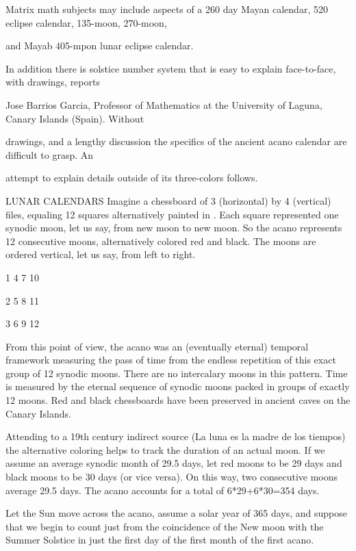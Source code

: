 \documentclass[12pt]{article}
\begin{document}
Matrix math subjects may include aspects of a 260 day Mayan calendar, 520 eclipse  calendar,  135-moon, 270-moon,

and Mayab 405-mpon lunar eclipse calendar. 

In addition there is solstice number system that is easy to explain face-to-face, with drawings, reports 

Jose Barrios Garcia, Professor of Mathematics at the University of Laguna, Canary Islands (Spain). Without 

drawings, and a lengthy discussion the specifics of the ancient acano calendar are difficult to grasp. An 

attempt to explain details outside of its three-colors follows.

LUNAR CALENDARS
Imagine a chessboard of 3 (horizontal) by 4 (vertical) files, equaling 12 squares alternatively painted in 
. Each square represented one synodic moon, let us say, from new moon to new moon. So the acano represents 12 consecutive moons, alternatively colored red and black. The moons are ordered vertical, let us say, from left to right.

 

1     4     7    10

2     5     8    11

3     6     9    12

 

From this point of view, the acano was an (eventually eternal) temporal framework measuring the pass of time from the endless repetition of this exact group of 12 synodic moons. There are no intercalary moons in this pattern. Time is measured by the eternal sequence of synodic moons packed in groups of exactly 12 moons. Red and black chessboards have been preserved in ancient caves on the Canary Islands.

Attending to a 19th century indirect source (La luna es la madre de los tiempos) the alternative coloring helps to track the duration of an actual moon. If we assume an average synodic month of 29.5 days, let red moons to be 29 days and black moons to be 30 days (or vice versa). On this way, two consecutive moons average 29.5 days. The acano accounts for a total of 6*29+6*30=354 days.

Let the Sun move across the acano, assume a solar year of 365 days, and suppose that we begin to count just from the coincidence of the New moon with the Summer Solstice in just the first day of the first month of the first acano.
\end{document}
